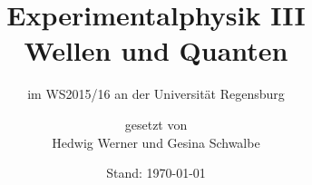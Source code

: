 \usepackage[utf8]{inputenc}
\usepackage[T1]{fontenc}
\usepackage{babel}
\usepackage{csquotes}
\usepackage{lmodern}
\usepackage{microtype}
\usepackage{makeidx}
\makeindex
%
% 
\usepackage[intoc, refpage]{nomencl}
\setlength{\nomitemsep}{0pt}
\makenomenclature
\usepackage[backend=biber]{biblatex}


\usepackage{color}

\usepackage{amsmath}
\usepackage{mathtools}
\usepackage{amssymb}
\usepackage{dsfont}
\usepackage{amsthm}
\usepackage[
output-decimal-marker={,},
exponent-product=\cdot,
per-mode=fraction]
{siunitx}
\usepackage{booktabs}
\usepackage{enumerate}

\usepackage[%
pdftitle={Experimentalphysik III (Wellen und Quanten)},
pdfauthor={Hedwig Werner}]%
{hyperref}
\usepackage{tabularx}
\usepackage{graphicx}
\usepackage{wrapfig}
\usepackage{gensymb}

\setcounter{secnumdepth}{4}
\renewcommand{\theparagraph}{\alph{paragraph})} 

\subject{Vorlesungsmitschrift}
\title{Experimentalphysik III\\ Wellen und Quanten}
\subtitle{im WS2015/16 an der Universität Regensburg}
\date{Stand: \today}
\author{{\Large gesetzt von}\\ Hedwig Werner und Gesina Schwalbe}


